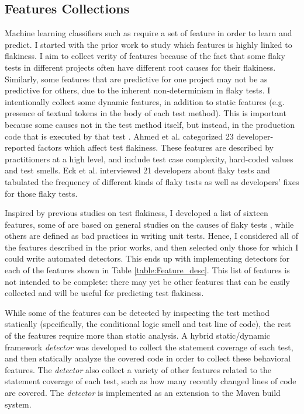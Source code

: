 \subsection{Features Collections}
\label{sec:detector}
Machine learning classifiers such as \sysName require a set of feature in order to learn and predict. I started with the prior work \cite{luo2014empirical,eck2019understanding,bell2018deflaker} to study which features is highly linked to flakiness. I aim to collect verity of features because of the fact that some flaky tests in different projects often have different root causes for their flakiness\cite{luo2014empirical}. Similarly, some features that are predictive for one project may not be as predictive for others, due to the inherent non-determinism in flaky tests. 
I intentionally collect some dynamic features, in addition to static features (e.g. presence of textual tokens in the body of each test method). This is important because some causes not in the test method itself, but instead, in the production code that is executed by that test \cite{eck2019understanding}.
Ahmed et al. \cite{ahmad2021empirical} categorized 23 developer-reported factors which affect test flakiness. 
These features are described by practitioners at a high level, and include test case complexity, hard-coded values and test smells.
Eck et al. \cite{eck2019understanding} interviewed 21 developers about flaky tests and tabulated the frequency of different kinds of flaky tests as well as developers' fixes for those flaky tests. 


Inspired by previous studies on test flakiness, I developed a list of sixteen features, 
some of are based on general studies on the causes of flaky tests \cite{luo2014empirical,ahmad2021empirical}, while others are defined as bad practices in writing unit tests.
Hence, I considered all of the features described in the prior works, and then selected only those for which I could write automated detectors.
This ends up with implementing detectors for each of the features shown in Table \ref{table:Feature_desc}. This list of features is not intended to be complete: there may yet be other features that can be easily collected and will be useful for predicting test flakiness.

While some of the features can be detected by inspecting the test method statically (specifically, the conditional logic smell and test line of code), the rest of the features require more than static analysis.
A hybrid static/dynamic framework \emph{detector} was developed to collect the statement coverage of each test, and then statically analyze the covered code in order to collect these behavioral features.
The \emph{detector} also collect a variety of other features related to the statement coverage of each test, such as how many recently changed lines of code are covered.
The \emph{detector} is implemented as an extension to the Maven build system.



